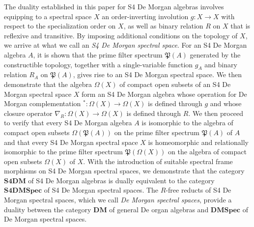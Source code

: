 \documentclass{amsart}
\theoremstyle{plain}
\theoremstyle{definition}
\begin{document}
The duality established in this paper for S4 De Morgan algebras involves equipping to a spectral space $X$ an order-inverting involution $g\colon X\to X$ with respect to the specialization order on $X$, as well as binary relation $R$ on $X$ that is reflexive and transitive. By imposing additional conditions on the topology of $X$, we arrive at what we call an \emph{S4 De Morgan spectral space}. For an S4 De Morgan algebra $A$, it is shown that the prime filter spectrum $\mathfrak{P}(A)$ generated by the constructible topology, together with a single-variable function $g_A$ and binary relation $R_A$ on $\mathfrak{P}(A)$, gives rise to an S4 De Morgan spectral space. We then demonstrate that the algebra $\Omega(X)$ of compact open subsets of an S4 De Morgan spectral space $X$ form an S4 De Morgan algebra whose operation for De Morgan complementation $^*\colon\Omega(X)\to\Omega(X)$ is defined through $g$ and whose closure operator $\nabla_R\colon\Omega(X)\to\Omega(X)$ is defined through $R$. We then proceed to verify that every S4 De Morgan algebra $A$ is isomorphic to the algebra of compact open subsets $\Omega(\mathfrak{P}(A))$ on the prime filter spectrum $\mathfrak{P}(A)$ of $A$ and that every S4 De Morgan spectral space $X$ is homeomorphic and relationally isomorphic to the prime filter spectrum $\mathfrak{P}(\Omega(X))$ on the algebra of compact open subsets $\Omega(X)$ of $X$. With the introduction of suitable spectral frame morphisms on S4 De Morgan spectral spaces, we demonstrate that the category $\mathbf{S4DM}$ of S4 De Morgan algebras is dually equivalent to the category $\mathbf{S4DMSpec}$ of S4 De Morgan spectral spaces. The $R$-free reducts of S4 De Morgan spectral spaces, which we call \emph{De Morgan spectral spaces}, provide a duality between the category $\mathbf{DM}$ of general De organ algebras and $\mathbf{DMSpec}$ of De Morgan spectral spaces.   
\end{document}
